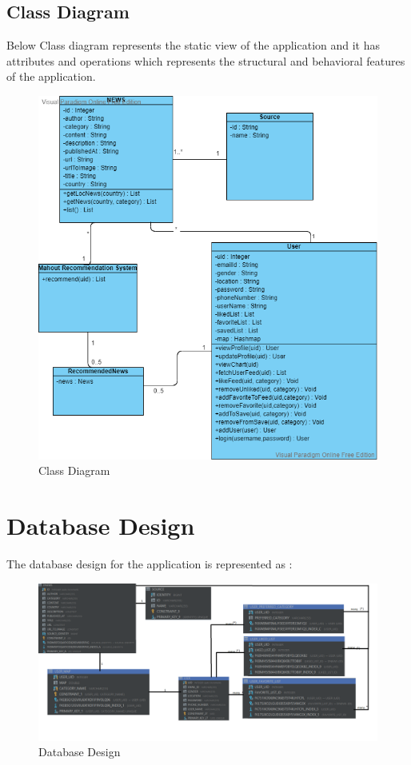            \subsection{Class Diagram}
            Below Class diagram represents the static view of the application and it has attributes and operations which represents the structural and behavioral features of the application.
             \begin{figure}[h!]
             \begin{center}
             \includegraphics[scale=0.7]{images/Classdiagram.png}
              \centering \caption{Class Diagram}
             \end{center}
              \end{figure}
              
\section{Database Design}
      The database design for the application is represented as :
       \begin{figure}[h!]
             \begin{center}
             \includegraphics[scale=0.45]{images/DatabaseDesign.png}
              \centering \caption{Database Design}
             \end{center}
              \end{figure}
